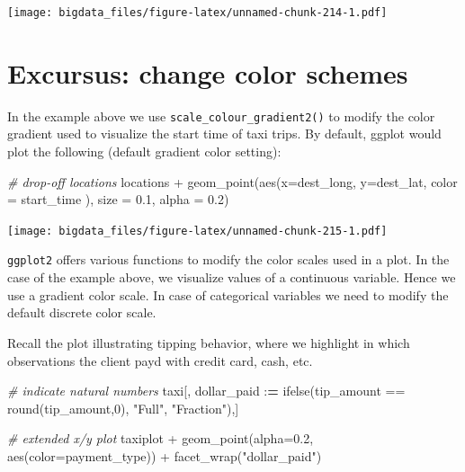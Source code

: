 \documentclass[
  12pt,
]{style/krantz}
\newenvironment{Shaded}{\begin{snugshade}}{\end{snugshade}}
\newcommand{\AttributeTok}[1]{\textcolor[rgb]{0.77,0.63,0.00}{#1}}
\newcommand{\CommentTok}[1]{\textcolor[rgb]{0.56,0.35,0.01}{\textit{#1}}}
\newcommand{\DecValTok}[1]{\textcolor[rgb]{0.00,0.00,0.81}{#1}}
\newcommand{\ErrorTok}[1]{\textcolor[rgb]{0.64,0.00,0.00}{\textbf{#1}}}
\newcommand{\FloatTok}[1]{\textcolor[rgb]{0.00,0.00,0.81}{#1}}
\newcommand{\FunctionTok}[1]{\textcolor[rgb]{0.00,0.00,0.00}{#1}}
\newcommand{\NormalTok}[1]{#1}
\newcommand{\SpecialCharTok}[1]{\textcolor[rgb]{0.00,0.00,0.00}{#1}}
\newcommand{\StringTok}[1]{\textcolor[rgb]{0.31,0.60,0.02}{#1}}
\begin{document}
\texttt{[image: bigdata\_files/figure-latex/unnamed-chunk-214-1.pdf]}

\hypertarget{excursus-change-color-schemes}{%
\section{Excursus: change color schemes}\label{excursus-change-color-schemes}}

In the example above we use \texttt{scale\_colour\_gradient2()} to modify the color gradient used to visualize the start time of taxi trips. By default, ggplot would plot the following (default gradient color setting):

\begin{Shaded}
\begin{Highlighting}[]
\CommentTok{\# drop{-}off locations }
\NormalTok{locations }\SpecialCharTok{+}
     \FunctionTok{geom\_point}\NormalTok{(}\FunctionTok{aes}\NormalTok{(}\AttributeTok{x=}\NormalTok{dest\_long, }\AttributeTok{y=}\NormalTok{dest\_lat, }\AttributeTok{color =}\NormalTok{ start\_time ),}
                \AttributeTok{size =} \FloatTok{0.1}\NormalTok{,}
                \AttributeTok{alpha =} \FloatTok{0.2}\NormalTok{) }
\end{Highlighting}
\end{Shaded}

\texttt{[image: bigdata\_files/figure-latex/unnamed-chunk-215-1.pdf]}

\texttt{ggplot2} offers various functions to modify the color scales used in a plot. In the case of the example above, we visualize values of a continuous variable. Hence we use a gradient color scale. In case of categorical variables we need to modify the default discrete color scale.

Recall the plot illustrating tipping behavior, where we highlight in which observations the client payd with credit card, cash, etc.

\begin{Shaded}
\begin{Highlighting}[]
\CommentTok{\# indicate natural numbers}
\NormalTok{taxi[, dollar\_paid }\SpecialCharTok{:}\ErrorTok{=} \FunctionTok{ifelse}\NormalTok{(tip\_amount }\SpecialCharTok{==} \FunctionTok{round}\NormalTok{(tip\_amount,}\DecValTok{0}\NormalTok{), }\StringTok{"Full"}\NormalTok{, }\StringTok{"Fraction"}\NormalTok{),]}


\CommentTok{\# extended x/y plot}
\NormalTok{taxiplot }\SpecialCharTok{+}
     \FunctionTok{geom\_point}\NormalTok{(}\AttributeTok{alpha=}\FloatTok{0.2}\NormalTok{, }\FunctionTok{aes}\NormalTok{(}\AttributeTok{color=}\NormalTok{payment\_type)) }\SpecialCharTok{+}
     \FunctionTok{facet\_wrap}\NormalTok{(}\StringTok{"dollar\_paid"}\NormalTok{)}
\end{Highlighting}
\end{Shaded}
\end{document}
